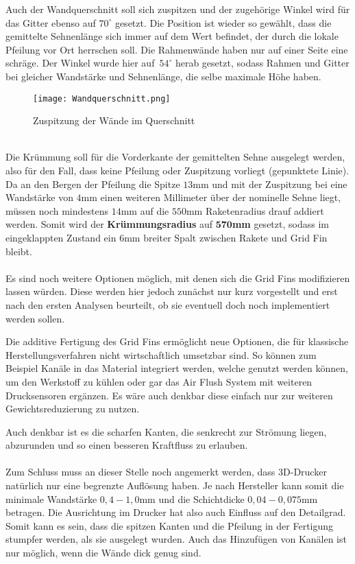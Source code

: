 Auch der Wandquerschnitt soll sich zuspitzen und der zugehörige Winkel wird für das Gitter ebenso auf $70^\circ$ gesetzt. Die Position ist wieder so gewählt, dass die gemittelte Sehnenlänge sich immer auf dem Wert befindet, der durch die lokale Pfeilung vor Ort herrschen soll. Die Rahmenwände haben nur auf einer Seite eine schräge. Der Winkel wurde hier auf\ $54^\circ$ herab gesetzt, sodass Rahmen und Gitter bei gleicher Wandstärke und Sehnenlänge, die selbe maximale Höhe haben.
\begin{figure}
	\centering
	\texttt{[image: Wandquerschnitt.png]}
	\caption{Zuspitzung der Wände im Querschnitt}
\end{figure}\\
Die Krümmung soll für die Vorderkante der gemittelten Sehne ausgelegt werden, also für den Fall, dass keine Pfeilung oder Zuspitzung vorliegt (gepunktete Linie). Da an den Bergen der Pfeilung die Spitze $13$mm und mit der Zuspitzung bei eine Wandstärke von $4$mm einen weiteren Millimeter über der nominelle Sehne liegt, müssen noch mindestens $14$mm auf die $550$mm Raketenradius drauf addiert werden. Somit wird der \textbf{Krümmungsradius} auf $\mathbf{570}$\textbf{mm} gesetzt, sodass im eingeklappten Zustand ein $6$mm breiter Spalt zwischen Rakete und Grid Fin bleibt.
\\~\\
Es sind noch weitere Optionen möglich, mit denen sich die Grid Fins modifizieren lassen würden. Diese werden hier jedoch zunächst nur kurz vorgestellt und erst nach den ersten Analysen beurteilt, ob sie eventuell doch noch implementiert werden sollen.

Die additive Fertigung des Grid Fins ermöglicht neue Optionen, die für klassische Herstellungsverfahren nicht wirtschaftlich umsetzbar sind. So können zum Beispiel Kanäle in das Material integriert werden, welche genutzt werden können, um den Werkstoff zu kühlen oder gar das Air Flush System mit weiteren Drucksensoren ergänzen. Es wäre auch denkbar diese einfach nur zur weiteren Gewichtsreduzierung zu nutzen.

Auch denkbar ist es die scharfen Kanten, die senkrecht zur Strömung liegen, abzurunden und so einen besseren Kraftfluss zu erlauben.
\\~\\
Zum Schluss muss an dieser Stelle noch angemerkt werden, dass 3D-Drucker natürlich nur eine begrenzte Auflösung haben. Je nach Hersteller kann somit die minimale Wandstärke $0,4-1,0$mm \cite{eos, preise} und die Schichtdicke $0,04-0,075$mm \cite{preise} betragen. Die Ausrichtung im Drucker hat also auch Einfluss auf den Detailgrad. Somit kann es sein, dass die spitzen Kanten und die Pfeilung in der Fertigung stumpfer werden, als sie ausgelegt wurden. Auch das Hinzufügen von Kanälen ist nur möglich, wenn die Wände dick genug sind.
